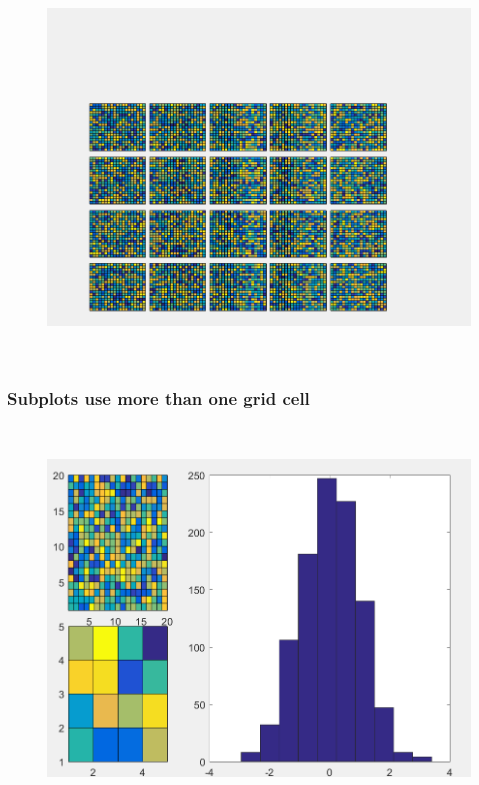 \documentclass{article}
\begin{document}
	
	
	\begin{figure}[H]
		\centering
		\includegraphics[height = 4in]{axgridex1}
	\end{figure}

	\clearpage
	\subsubsection*{Subplots use more than one grid cell}
	
	
	
	\begin{figure}[H]
		\centering
		\includegraphics[height = 4in]{axgridex2}
	\end{figure}
\end{document}
